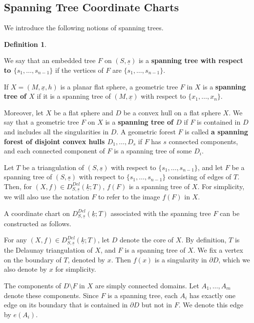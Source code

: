 \documentclass{compositio}
\numberwithin{equation}{section}
\numberwithin{figure}{section}
\theoremstyle{definition}
\newtheorem{definition}{Definition}[section]
\theoremstyle{plain}
\begin{document}
{\subsection{Spanning Tree Coordinate Charts}\label{sec:spanningtreechartinfinitecase}

We introduce the following notions of spanning trees.
\begin{definition}\label{def:spanningtree}

We say that an embedded tree $F$ on $(S,\underline{s})$ is a \textbf{spanning tree with respect to $\{s_1, \ldots, s_{n-1}\}$} if the vertices of $F$ are $\{s_1, \ldots, s_{n-1}\}$.

If $X = (M,\underline{x},h)$ is a planar flat sphere, a geometric tree $F$ in $X$ is a \textbf{spanning tree of $X$} if it is a spanning tree of $(M,\underline{x})$ with respect to $\{x_1,\ldots,x_n\}$.

Moreover, let $X$ be a flat sphere and $D$ be a convex hull on a flat sphere $X$. We say that a geometric tree $F$ on $X$ is a \textbf{spanning tree of $D$} if $F$ is contained in $D$ and includes all the singularities in $D$. A geometric forest $F$ is called \textbf{a spanning forest of disjoint convex hulls $D_1, \ldots, D_s$} if $F$ has $s$ connected components, and each connected component of $F$ is a spanning tree of some $D_i$.
\end{definition}

Let $T$ be a triangulation of $(S, \underline{s})$ with respect to $\{s_1, \ldots, s_{n-1}\}$, and let $F$ be a spanning tree of $(S, \underline{s})$ with respect to $\{s_1, \ldots, s_{n-1}\}$ consisting of edges of $T$. Then, for $(X, f)\in D_{S,\underline{s}}^{Del}(\underline{k};T)$, $f(F)$ is a spanning tree of $X$. For simplicity, we will also use the notation $F$ to refer to the image $f(F)$ in $X$.

A coordinate chart on $D_{S,\underline{s}}^{Del}(\underline{k};T)$ associated with the spanning tree $F$ can be constructed as follows. 

For any $(X, f) \in D_{S,\underline{s}}^{Del}(\underline{k};T)$, let $D$ denote the core of $X$. By definition, $T$ is the Delaunay triangulation of $X$, and $F$ is a spanning tree of $X$. We fix a vertex on the boundary of $T$, denoted by $x$. Then $f(x)$ is a singularity in $\partial D$, which we also denote by $x$ for simplicity.

The components of $D \setminus F$ in $X$ are simply connected domains. Let $A_1, \ldots, A_m$ denote these components. Since $F$ is a spanning tree, each $A_i$ has exactly one edge on its boundary that is contained in $\partial D$ but not in $F$. We denote this edge by $e(A_i)$.

}
\end{document}
